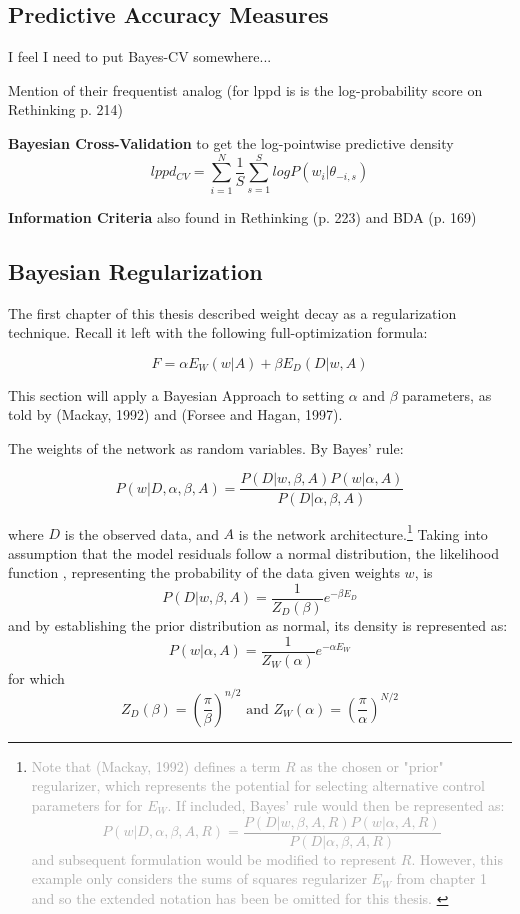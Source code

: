 \subsection{Predictive Accuracy Measures}
I feel I need to put Bayes-CV somewhere...

Mention of their frequentist analog (for lppd is is the log-probability score on Rethinking p. 214)

\textbf{Bayesian Cross-Validation} to get the log-pointwise predictive density
$$
lppd_{CV} = \sum_{i=1}^N \frac{1}{S} \sum_{s=1}^S logP(w_i|\theta_{-i,s})
$$

\textbf{Information Criteria} also found in Rethinking (p. 223) and BDA (p. 169)


\subsection{Bayesian Regularization}


The first chapter of this thesis described weight decay as a regularization technique.  Recall it left with the following full-optimization formula:

$$
F = \alpha E_W(w|A) + \beta E_D(D|w,A)
$$



This section will apply a Bayesian Approach to setting $\alpha$ and $\beta$ parameters, as told by (Mackay, 1992) \cite{mackay1992practical} and (Forsee and Hagan, 1997). \cite{foresee1997gauss}

The weights of the network as random variables. By Bayes' rule:
 
$$
P(w|D,\alpha,\beta,A) = \frac{P(D|w,\beta,A) P(w|\alpha,A)}{P(D|\alpha,\beta,A)}
$$

where $D$ is the observed data, and $A$ is the network architecture.\footnote{
\textcolor{darkgray}{
Note that (Mackay, 1992) defines a term $R$ as the chosen or "prior" regularizer, which represents the potential for selecting alternative control parameters for for $E_W$.  If included, Bayes' rule would then be represented  as:
$$
P(w|D,\alpha,\beta,A,R) = \frac{P(D|w,\beta,A,R) P(w|\alpha,A,R)}{P(D|\alpha,\beta,A,R)}
$$
 and subsequent formulation would be modified to represent $R$. However, this example only considers the sums of squares regularizer $E_W$ from chapter 1 and so the extended notation has been be omitted for this thesis.
 }}
Taking into assumption that the model residuals follow a normal distribution, the likelihood function \cite{foresee1997gauss}, representing the probability of the data given weights $w$, is
$$
P(D|w,\beta,A) = \frac{1}{Z_D(\beta)} e^{-\beta E_D}
$$
and by establishing the prior distribution as normal, its density is represented as:
$$
P(w|\alpha,A) = \frac{1}{Z_W(\alpha)} e^{-\alpha E_W}
$$
for which
$$
Z_D(\beta) = \left( \frac{\pi}{\beta} \right) ^{n/2} \text{ and }
Z_W(\alpha) = \left( \frac{\pi}{\alpha} \right) ^{N/2}
$$

